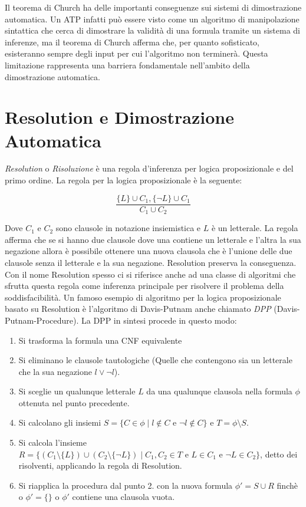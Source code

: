 \documentclass[./main.tex]{subfiles}
\begin{document}
Il teorema di Church ha delle importanti conseguenze sui sistemi di dimostrazione automatica.
Un ATP infatti può essere visto come un algoritmo di manipolazione sintattica che cerca di dimostrare la validità di una formula
tramite un sistema di inferenze,
ma il teorema di Church afferma che, per quanto sofisticato, esisteranno sempre degli input per cui l'algoritmo non terminerà.
Questa limitazione rappresenta una barriera fondamentale nell'ambito della dimostrazione automatica.


\section{Resolution e Dimostrazione Automatica} \label{sec:resolution}
\textit{Resolution} o \textit{Risoluzione} è una regola d'inferenza per logica proposizionale e del primo ordine.
La regola per la logica proposizionale è la seguente:

$$ \frac{\{L\} \cup C_1, \{\lnot L\} \cup C_1}{C_1 \cup C_2} $$

Dove $C_1$ e $C_2$ sono clausole in notazione insiemistica e $L$ è un letterale. 
La regola afferma che se si hanno due clausole dove una contiene un letterale e l'altra la sua negazione allora è possibile
ottenere una nuova clausola che è l'unione delle due clausole senza il letterale e la sua negazione.
Resolution preserva la conseguenza. 
Con il nome Resolution spesso ci si riferisce anche ad una classe di algoritmi che sfrutta questa regola come inferenza principale 
per risolvere il problema della soddisfacibilità.
Un famoso esempio di algoritmo per la logica proposizionale basato su Resolution è l'algoritmo di Davis-Putnam anche chiamato \textit{DPP} (Davis-Putnam-Procedure).
La DPP in sintesi procede in questo modo:

\begin{enumerate}
  \item Si trasforma la formula una CNF equivalente
  \item Si eliminano le clausole tautologiche
  (Quelle che contengono sia un letterale che la sua negazione $l \lor \lnot l$).
  \item Si sceglie un qualunque letterale $L$ da una qualunque clausola nella formula $\phi$ ottenuta nel punto precedente.
  \item Si calcolano gli insiemi $S = \{C \in \phi \mid l \notin C \text{ e } \lnot l \notin C\}$ e $T = \phi \setminus S$.
  \item Si calcola l'insieme 
  $R = \{(C_1 \setminus \{L\}) \cup (C_2 \setminus \{\lnot L\}) \mid C_1, C_2 \in T \text{ e } L \in C_1 \text{ e } \lnot L \in C_2\}$, 
  detto dei risolventi, applicando la regola di Resolution.
  \item Si riapplica la procedura dal punto 2. con la nuova formula $\phi' = S \cup R$ finchè o $\phi' = \{\}$
  o $\phi'$ contiene una clausola vuota.
\end{enumerate}
\end{document}
